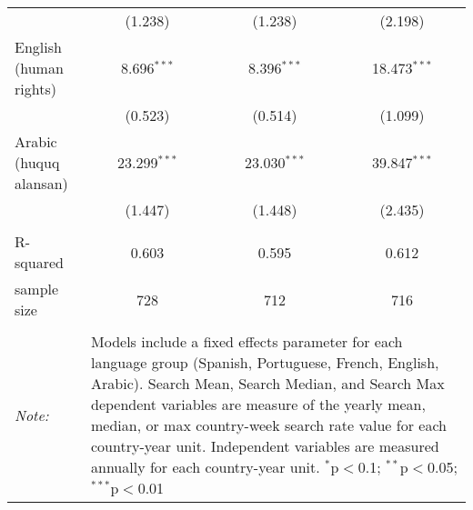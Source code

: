 \begin{table}[!htbp]
\begin{tabular}{@{\extracolsep{5pt}}lccc}
  & (1.238) & (1.238) & (2.198) \\ 
  English (human rights) & 8.696$^{***}$ & 8.396$^{***}$ & 18.473$^{***}$ \\ 
  & (0.523) & (0.514) & (1.099) \\ 
  Arabic (huquq alansan) & 23.299$^{***}$ & 23.030$^{***}$ & 39.847$^{***}$ \\ 
  & (1.447) & (1.448) & (2.435) \\ 
 \hline \\[-1.8ex] 
R-squared  & 0.603 & 0.595 & 0.612 \\ 
sample size  & 728 & 712 & 716 \\ 
\hline 
\hline \\[-1.8ex] 
\textit{Note:}  & \multicolumn{3}{l}{\parbox[t]{8cm}{Models include a fixed effects parameter for each language group (Spanish, Portuguese, French, English, Arabic). Search Mean, Search Median, and Search Max dependent variables are measure of the yearly mean, median, or max country-week search rate value for each country-year unit. Independent variables are measured annually for each country-year unit. $^{*}$p$<$0.1; $^{**}$p$<$0.05; $^{***}$p$<$0.01}} \\ 
\end{tabular} 
\end{table} 
